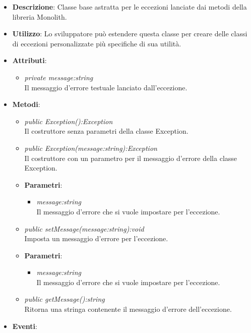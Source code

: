 \begin{itemize}
\item \textbf{Descrizione}: Classe base astratta per le eccezioni lanciate dai metodi della libreria Monolith.
\item \textbf{Utilizzo}: Lo sviluppatore può estendere questa classe per creare delle classi di eccezioni personalizzate più specifiche di sua utilità.
\item \textbf{Attributi}: 
	\begin{itemize}
	\item \textit{private message:string}\\
	Il messaggio d'errore testuale lanciato dall'eccezione.
	\end{itemize}
\item \textbf{Metodi}:
	\begin{itemize}
	\item \textit{public Exception():Exception}\\
	Il costruttore senza parametri della classe Exception.
	\item \textit{public Exception(message:string):Exception}\\
	Il costruttore con un parametro per il messaggio d'errore della classe Exception.
			\item{\textbf{Parametri}: \begin{itemize}
			\item \textit{message:string}\\
			Il messaggio d'errore che si vuole impostare per l'eccezione.
			\end{itemize}}
	\item \textit{public setMessage(message:string):void}\\
	Imposta un messaggio d'errore per l'eccezione.
			\item{\textbf{Parametri}: \begin{itemize}
			\item \textit{message:string}\\
			Il messaggio d'errore che si vuole impostare per l'eccezione.
			\end{itemize}}
	\item \textit{public getMessage():string}\\
	Ritorna una stringa contenente il messaggio d'errore dell'eccezione.
	\end{itemize}
\item \textbf{Eventi}:
\end{itemize}


